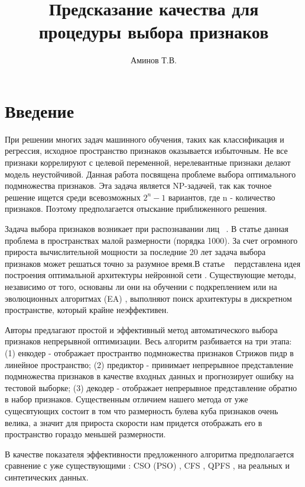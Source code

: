 \documentclass[12pt,twoside]{article}
\title
    [Предсказание качества для процедуры выбора признаков] %
    {Предсказание качества для процедуры выбора признаков}
\author
    [Аминов Т.В.] %
    {Аминов Т.В.} %
    [Аминов Т.В.] %
\begin{document}
\maketitle
\section{Введение}
При решении многих задач машинного обучения, таких как классификация и регрессия, исходное пространство признаков оказывается избыточным. Не все признаки коррелируют с целевой переменной, нерелевантные признаки делают модель неустойчивой. Данная работа посвящена проблеме выбора оптимального подмножества признаков. Эта задача является NP-задачей, так как точное решение ищется среди всевозможных $2^n - 1$ вариантов, где n - количество признаков. Поэтому предполагается отыскание приближенного решения.

Задача выбора признаков возникает при  распознавании лиц  ~\cite{inproceedings}. В статье \cite{bertsimas2016} данная проблема в пространствах малой размерности (порядка 1000). За счет огромного прироста вычислительной мощности за последние 20 лет задача выбора признаков может решаться точно за разумное время.В статье ~\cite{cao2018learnable} пердставлена идея построения оптимальной архитектуры нейронной сети . Существующие методы, независимо от того, основаны ли они на обучении с подкреплением \cite{article2} или на эволюционных алгоритмах (EA) \cite{5989810}, выполняют поиск архитектуры в дискретном пространстве, который крайне неэффективен.

 Авторы предлагают простой и эффективный метод автоматического выбора признаков непрерывной оптимизации. Весь алгоритм разбивается на три этапа: (1) енкодер - отображает пространтво подмножества признаков Стрижов пидр в линейное пространство; (2) предиктор - принимает непрерывное представление подмножества признаков  в качестве входных данных и прогнозирует ошибку на тестовой выборке; (3) декодер - отображает непрерывное представление обратно в набор признаков. Существенным отличием нашего метода от уже сущесвтующих состоит в том что размерность булева куба признаков очень велика, а значит для прироста скорости нам придется отображать его в пространство гораздо меньшей размерности.


В качестве показателя эффективности предложенного алгоритма предполагается сравнение с уже существующими : CSO (PSO) \cite{article}, CFS \cite{Gu2018}, QPFS \cite{Rodriguez-Lujan:2010:QPF:1756006.1859900}, на реальных и синтетических данных.
\end{document}
